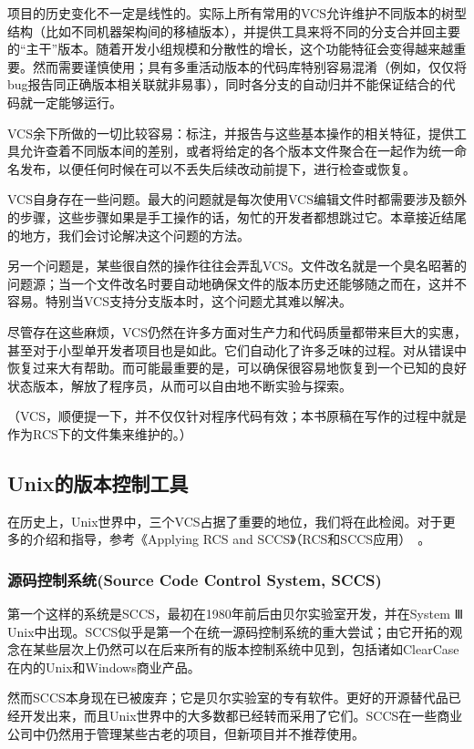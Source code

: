 \documentclass[12pt,oneside]{ctexbook}
\begin{document}
\begin{common-format}
项目的历史变化不一定是线性的。实际上所有常用的VCS允许维护不同版本的树型结构（比如不同机器架构间的移植版本），并提供工具来将不同的分支合并回主要的“主干”版本。随着开发小组规模和分散性的增长，这个功能特征会变得越来越重要。然而需要谨慎使用；具有多重活动版本的代码库特别容易混淆（例如，仅仅将bug报告同正确版本相关联就非易事），同时各分支的自动归并不能保证结合的代码就一定能够运行。

VCS余下所做的一切比较容易：标注，并报告与这些基本操作的相关特征，提供工具允许查着不同版本间的差别，或者将给定的各个版本文件聚合在一起作为统一命名发布，以便任何时候在可以不丢失后续改动前提下，进行检查或恢复。

VCS自身存在一些问题。最大的问题就是每次使用VCS编辑文件时都需要涉及额外的步骤，这些步骤如果是手工操作的话，匆忙的开发者都想跳过它。本章接近结尾的地方，我们会讨论解决这个问题的方法。

另一个问题是，某些很自然的操作往往会弄乱VCS。文件改名就是一个臭名昭著的问题源；当一个文件改名时要自动地确保文件的版本历史还能够随之而在，这并不容易。特别当VCS支持分支版本时，这个问题尤其难以解决。

尽管存在这些麻烦，VCS仍然在许多方面对生产力和代码质量都带来巨大的实惠，甚至对于小型单开发者项目也是如此。它们自动化了许多乏味的过程。对从错误中恢复过来大有帮助。而可能最重要的是，可以确保很容易地恢复到一个已知的良好状态版本，解放了程序员，从而可以自由地不断实验与探索。

（VCS，顺便提一下，并不仅仅针对程序代码有效；本书原稿在写作的过程中就是作为RCS下的文件集来维护的。）

\subsection{Unix的版本控制工具}
在历史上，Unix世界中，三个VCS占据了重要的地位，我们将在此检阅。对于更多的介绍和指导，参考《Applying RCS and SCCS》（RCS和SCCS应用）~\cite{Bolinger-Bronson}。

\subsubsection{源码控制系统(Source Code Control System, SCCS)}
第一个这样的系统是SCCS，最初在1980年前后由贝尔实验室开发，并在System Ⅲ Unix中出现。SCCS似乎是第一个在统一源码控制系统的重大尝试；由它开拓的观念在某些层次上仍然可以在后来所有的版本控制系统中见到，包括诸如ClearCase在内的Unix和Windows商业产品。

然而SCCS本身现在已被废弃；它是贝尔实验室的专有软件。更好的开源替代品已经开发出来，而且Unix世界中的大多数都已经转而采用了它们。SCCS在一些商业公司中仍然用于管理某些古老的项目，但新项目并不推荐使用。


\end{common-format}
\end{document}
